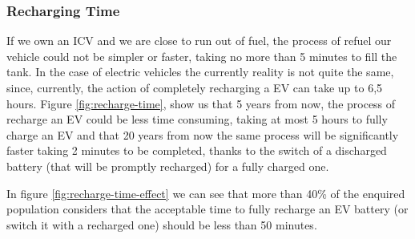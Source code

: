 \subsubsection{Recharging Time}
If we own an ICV and we are close to run out of fuel, the process of refuel our vehicle could not be simpler or faster, taking no more than 5 minutes to fill the tank. In the case of electric vehicles the currently reality is not quite the same, since, currently, the action of completely recharging a EV can take up to 6,5 hours. Figure \ref{fig:recharge-time}, show us that 5 years from now, the process of recharge an EV could be less time consuming, taking at most 5 hours to fully charge an EV and that 20 years from now the same process will be significantly faster taking 2 minutes to be completed, thanks to the switch of a discharged battery (that will be promptly recharged) for a fully charged one.

In figure \ref{fig:recharge-time-effect} we can see that more than 40\% of the enquired population considers that the acceptable time to fully recharge an EV battery (or switch it with a recharged one) should be less than 50 minutes.

\vspace{1cm}

